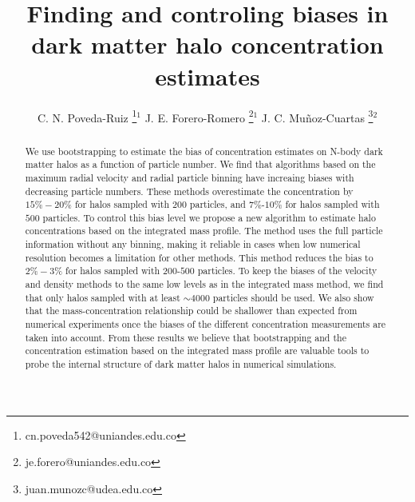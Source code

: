 \documentclass{emulateapj}
\begin{document}
\title{Finding and controling biases in dark matter halo concentration estimates}
\author{
  C. N. Poveda-Ruiz \thanks{cn.poveda542@uniandes.edu.co}$^{1}$
  J. E. Forero-Romero \thanks{je.forero@uniandes.edu.co}$^{1}$
  J. C. Mu\~noz-Cuartas \thanks{juan.munozc@udea.edu.co}$^{2}$
}




\begin{abstract}
We use bootstrapping to estimate the bias of concentration
estimates on N-body dark matter halos as a function of particle
number. 
We find that algorithms based on the maximum radial velocity
and radial particle binning have increaing biases with decreasing 
particle numbers.
These methods overestimate the concentration by 
$15\%-20\%$ for halos sampled with $200$ particles, and $7\%$-$10\%$
for halos sampled with $500$ particles. 
To control this bias level we propose a new algorithm to estimate halo
concentrations based on the integrated mass profile. 
The method uses the full particle information without any binning,
making it reliable in cases when low numerical resolution becomes a
limitation for other methods.
This method reduces the bias to $2\%-3\%$ for halos sampled with
$200$-$500$ particles.
To keep the biases of the velocity and density methods to the same
low levels as in the integrated mass method, we find that only halos sampled
with at least $\sim 4000$ particles should be used.
We also show that the mass-concentration relationship could be
shallower than expected from numerical experiments once the biases 
of the different concentration measurements are taken into account.
From these results we believe that bootstrapping and the
concentration estimation based on the integrated mass profile are
valuable tools to probe the internal structure of dark matter halos
in numerical simulations.
\end{abstract}



\end{document}
